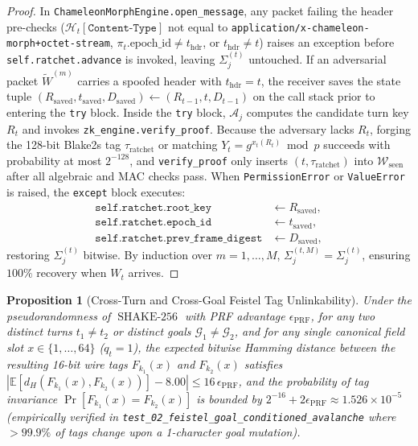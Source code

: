 \documentclass[conference,10pt]{IEEEtran}
\newtheorem{proposition}{Proposition}
\begin{document}
\begin{proof}
In \texttt{ChameleonMorphEngine.open\_message}, any packet failing the header pre-checks ($\mathcal{H}_t[\texttt{Content-Type}]$ not equal to \texttt{application/}\allowbreak\texttt{x-chameleon-morph+}\allowbreak\texttt{octet-stream}, $\pi_t.\text{epoch\_id} \ne t_{\text{hdr}}$, or $t_{\text{hdr}} \ne t$) raises an exception before \texttt{self.ratchet.advance} is invoked, leaving $\Sigma_j^{(t)}$ untouched. If an adversarial packet $\tilde{W}^{(m)}$ carries a spoofed header with $t_{\text{hdr}} = t$, the receiver saves the state tuple $(R_{\text{saved}}, t_{\text{saved}}, D_{\text{saved}}) \leftarrow (R_{t-1}, t, D_{t-1})$ on the call stack prior to entering the \texttt{try} block. Inside the \texttt{try} block, $\mathcal{A}_j$ computes the candidate turn key $R_t$ and invokes \texttt{zk\_engine.verify\_proof}. Because the adversary lacks $R_t$, forging the 128-bit Blake2s tag $\tau_{\text{ratchet}}$ or matching $Y_t = g^{x_t(R_t)} \bmod p$ succeeds with probability at most $2^{-128}$, and \texttt{verify\_proof} only inserts $(t, \tau_{\text{ratchet}})$ into $\mathcal{W}_{\text{seen}}$ after all algebraic and MAC checks pass. When \texttt{PermissionError} or \texttt{ValueError} is raised, the \texttt{except} block executes:
\begin{equation}
\label{eq:rollback_vars}
\begin{aligned}
\texttt{self.ratchet.root\_key} &\leftarrow R_{\text{saved}}, \\
\texttt{self.ratchet.epoch\_id} &\leftarrow t_{\text{saved}}, \\
\texttt{self.ratchet.prev\_frame\_digest} &\leftarrow D_{\text{saved}},
\end{aligned}
\end{equation}
restoring $\Sigma_j^{(t)}$ bitwise. By induction over $m = 1, \dots, M$, $\Sigma_j^{(t, M)} = \Sigma_j^{(t)}$, ensuring $100\%$ recovery when $W_t$ arrives.
\end{proof}

\begin{proposition}[Cross-Turn and Cross-Goal Feistel Tag Unlinkability]
\label{prop:avalanche}
Under the pseudorandomness of $\operatorname{SHAKE-256}$ with PRF advantage $\epsilon_{\text{PRF}}$, for any two distinct turns $t_1 \ne t_2$ or distinct goals $\mathcal{G}_1 \ne \mathcal{G}_2$, and for any single canonical field slot $x \in \{1,\dots,64\}$ ($q_t = 1$), the expected bitwise Hamming distance between the resulting 16-bit wire tags $F_{k_1}(x)$ and $F_{k_2}(x)$ satisfies $|\mathbb{E}[d_H(F_{k_1}(x), F_{k_2}(x))] - 8.00| \le 16\,\epsilon_{\text{PRF}}$, and the probability of tag invariance $\Pr[F_{k_1}(x) = F_{k_2}(x)]$ is bounded by $2^{-16} + 2\epsilon_{\text{PRF}} \approx 1.526 \times 10^{-5}$ (empirically verified in \texttt{test\_02\_feistel\_goal\_conditioned\_avalanche} where $>99.9\%$ of tags change upon a 1-character goal mutation).
\end{proposition}
\end{document}
